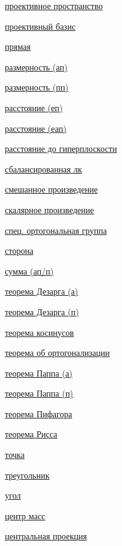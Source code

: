 \documentclass[a4paper,100pt]{article}
\theoremstyle{indented}
\theoremstyle{definition}
\theoremstyle{remark}
\begin{document}
\begin{multicols}{2}
    \hyperlink{s32}{проективное пространство} \ 

    \hyperlink{s45}{проективный базис} \ 
    
    \hyperlink{s18}{прямая} \ 
    
    \hyperlink{s15}{размерность (ап)} \ 
    
    \hyperlink{s34}{размерность (пп)} \ 

    \hyperlink{s56}{расстояние (еп)} \ 

    \hyperlink{s85}{расстояние (еап)} \ 

    \hyperlink{s71}{расстояние до гиперплоскости} \ 
    
    \hyperlink{s9}{сбалансированная лк} \ 

    \hyperlink{s82}{смешанное произведение} \ 

    \hyperlink{s53}{скалярное произведение} \ 

    \hyperlink{s76}{спец. ортогональная группа} \ 

    \hyperlink{s50}{сторона} \ 
    
    \hyperlink{s20}{сумма (ап/п)} \ 

    \hyperlink{s51}{теорема Дезарга (а)} \
    
    \hyperlink{s52}{теорема Дезарга (п)} \ 

    \hyperlink{s59}{теорема косинусов} \ 

    \hyperlink{s64}{теорема об ортогонализации} \ 

    \hyperlink{s46}{теорема Паппа (а)} \
    
    \hyperlink{s47}{теорема Паппа (п)} \ 

    \hyperlink{s62}{теорема Пифагора} \ 

    \hyperlink{s70}{теорема Рисса} \ 
    
    \hyperlink{s2}{точка} \ 

    \hyperlink{s48}{треугольник} \ 

    \hyperlink{s58}{угол} \ 
    
    \hyperlink{s12}{центр масс} \ 

    \hyperlink{s44}{центральная проекция} \ 

\end{multicols}
\end{document}
